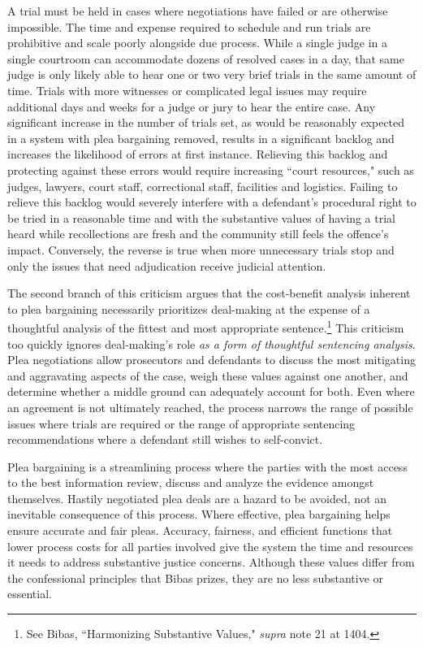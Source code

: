 A trial must be held in cases where negotiations have failed or are otherwise impossible. The time and expense required to schedule and run trials are prohibitive and scale poorly alongside due process. While a single judge in a single courtroom can accommodate dozens of resolved cases in a day, that same judge is only likely able to hear one or two very brief trials in the same amount of time. Trials with more witnesses or complicated legal issues may require additional days and weeks for a judge or jury to hear the entire case. Any significant increase in the number of trials set, as would be reasonably expected in a system with plea bargaining removed, results in a significant backlog and increases the likelihood of errors at first instance. Relieving this backlog and protecting against these errors would require increasing ``court resources," such as judges, lawyers, court staff, correctional staff, facilities and logistics. Failing to relieve this backlog would severely interfere with a defendant's procedural right to be tried in a reasonable time and with the substantive values of having a trial heard while recollections are fresh and the community still feels the offence's impact. Conversely, the reverse is true when more unnecessary trials stop and only the issues that need adjudication receive judicial attention.

The second branch of this criticism argues that the cost-benefit analysis inherent to plea bargaining necessarily prioritizes deal-making at the expense of a thoughtful analysis of the fittest and most appropriate sentence.\footnote{See Bibas, ``Harmonizing Substantive Values," \textit{supra} note 21 at 1404.} This criticism too quickly ignores deal-making's role \textit{as a form of thoughtful sentencing analysis}. Plea negotiations allow prosecutors and defendants to discuss the most mitigating and aggravating aspects of the case, weigh these values against one another, and determine whether a middle ground can adequately account for both. Even where an agreement is not ultimately reached, the process narrows the range of possible issues where trials are required or the range of appropriate sentencing recommendations where a defendant still wishes to self-convict.

Plea bargaining is a streamlining process where the parties with the most access to the best information review, discuss and analyze the evidence amongst themselves. Hastily negotiated plea deals are a hazard to be avoided, not an inevitable consequence of this process. Where effective, plea bargaining helps ensure accurate and fair pleas. Accuracy, fairness, and efficient functions that lower process costs for all parties involved give the system the time and resources it needs to address substantive justice concerns. Although these values differ from the confessional principles that Bibas prizes, they are no less substantive or essential.

